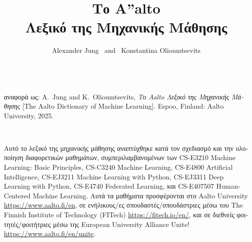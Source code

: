 \documentclass[journal,12pt,onecolumn]{article}
\begin{document}


\title {\vspace*{10mm}
	{\huge {\bf \foreignlanguage{greek}{Το} {\fontsize{40}{48}\selectfont \textbf{\textsf{A\hspace*{-2mm}''}}}\hspace*{-4mm}alto \\ \foreignlanguage{greek}{Λεξικό της Μηχανικής Μάθησης}}}  \\[-5mm] 
}

\author{\hspace{-2mm}Alexander Jung \ and \ Konstantina Olioumtsevits \\[-2mm]%
}

\maketitle
	\begin{center}
		\\[10mm]
{\large	\foreignlanguage{greek}{αναφορά ως}: A.\ Jung and K.\ Olioumtsevits, \textit{\foreignlanguage{greek}{Το} Aalto \foreignlanguage{greek}{Λεξικό της Μηχανικής Μάθησης}} [The Aalto Dictionary of Machine Learning]. Espoo, Finland: Aalto University, 2025.}
\end{center}

\newpage 
{}\

\noindent \foreignlanguage{greek}{Αυτό το λεξικό της μηχανικής μάθησης αναπτύχθηκε κατά τον σχεδιασμό
και την υλοποίηση διαφορετικών μαθημάτων, συμπεριλαμβανομένων των} CS-E3210 Machine Learning: 
Basic Principles, CS-C3240 Machine Learning, CS-E4800 Artificial Intelligence, CS-EJ3211 Machine Learning with 
Python, CS-EJ3311 Deep Learning with Python, CS-E4740 Federated Learning,
\foreignlanguage{greek}{και} CS-E407507 Human-Centered Machine Learning. \foreignlanguage{greek}{Αυτά τα 
μαθήματα προσφέρονται στο} Aalto University \url{https://www.aalto.fi/en}, \foreignlanguage{greek}{σε 
ενήλικους/ες σπουδαστές/σπουδάστριες μέσω του} The Finnish Institute of Technology (FITech) 
\url{https://fitech.io/en/}, \foreignlanguage{greek}{και σε διεθνείς φοιτητές/φοιτήτριες μέσω της} European University Alliance Unite! \url{https://www.aalto.fi/en/unite}.
\end{document}
